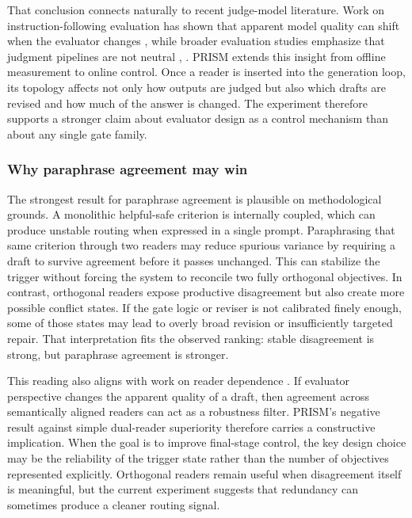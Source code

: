 \documentclass{article}
\begin{document}
That conclusion connects naturally to recent judge-model literature. Work on instruction-following evaluation has shown that apparent model quality can shift when the evaluator changes \cite{liu2024reife}, while broader evaluation studies emphasize that judgment pipelines are not neutral \cite{zhang2024evaluation}, \cite{zhou2025evaluating}. PRISM extends this insight from offline measurement to online control. Once a reader is inserted into the generation loop, its topology affects not only how outputs are judged but also which drafts are revised and how much of the answer is changed. The experiment therefore supports a stronger claim about evaluator design as a control mechanism than about any single gate family.

\subsubsection{Why paraphrase agreement may win}

\label{sec:why_paraphrase_agreement_may_win}

The strongest result for paraphrase agreement is plausible on methodological grounds. A monolithic helpful-safe criterion is internally coupled, which can produce unstable routing when expressed in a single prompt. Paraphrasing that same criterion through two readers may reduce spurious variance by requiring a draft to survive agreement before it passes unchanged. This can stabilize the trigger without forcing the system to reconcile two fully orthogonal objectives. In contrast, orthogonal readers expose productive disagreement but also create more possible conflict states. If the gate logic or reviser is not calibrated finely enough, some of those states may lead to overly broad revision or insufficiently targeted repair. That interpretation fits the observed ranking: stable disagreement is strong, but paraphrase agreement is stronger.

This reading also aligns with work on reader dependence \cite{marco2025reader}. If evaluator perspective changes the apparent quality of a draft, then agreement across semantically aligned readers can act as a robustness filter. PRISM's negative result against simple dual-reader superiority therefore carries a constructive implication. When the goal is to improve final-stage control, the key design choice may be the reliability of the trigger state rather than the number of objectives represented explicitly. Orthogonal readers remain useful when disagreement itself is meaningful, but the current experiment suggests that redundancy can sometimes produce a cleaner routing signal.
\end{document}
